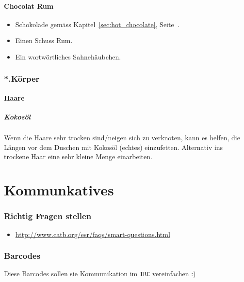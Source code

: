 \documentclass[oneside,12pt,a4paper]{scrartcl}
\newcommand{\linkitem}[1]{\item \url{#1}}
\begin{document}
\subsection{Chocolat Rum}
\begin{itemize}
	\item Schokolade gemäss Kapitel~\ref{sec:hot_chocolate}, Seite~\pageref{sec:hot_chocolate}.
	\item Einen Schuss Rum.
	\item Ein wortwörtliches Sahnehäubchen.
\end{itemize}
\section{*.Körper}
\subsection{Haare}
\subsubsection{Kokosöl}
Wenn die Haare sehr trocken sind/neigen sich zu verknoten, kann es helfen, die Längen vor dem Duschen mit Kokosöl (echtes) einzufetten. Alternativ ins trockene Haar eine sehr kleine Menge einarbeiten.

\part{Kommunkatives}

\section{Richtig Fragen stellen}
\begin{itemize}
\linkitem{http://www.catb.org/esr/faqs/smart-questions.html}
\end{itemize}


\newpage
\section{Barcodes}
Diese Barcodes sollen sie Kommunikation im \texttt{IRC} vereinfachen :) \newline
\end{document}
